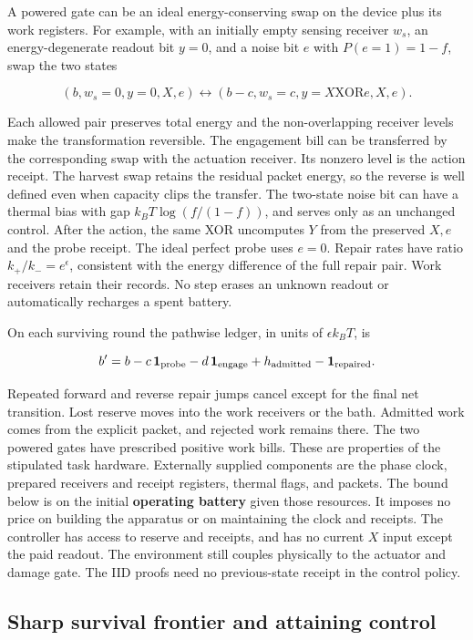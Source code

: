 \documentclass[
  11pt,
]{article}
\begin{document}
A powered gate can be an ideal energy-conserving swap on the device plus
its work registers. For example, with an initially empty sensing
receiver \(w_s\), an energy-degenerate readout bit \(y=0\), and a noise
bit \(e\) with \(P(e=1)=1-f\), swap the two states

\[
(b,w_s=0,y=0,X,e)\leftrightarrow
(b-c,w_s=c,y=X\mathbin{\mathrm{XOR}}e,X,e).
\]

Each allowed pair preserves total energy and the non-overlapping
receiver levels make the transformation reversible. The engagement bill
can be transferred by the corresponding swap with the actuation
receiver. Its nonzero level is the action receipt. The harvest swap
retains the residual packet energy, so the reverse is well defined even
when capacity clips the transfer. The two-state noise bit can have a
thermal bias with gap \(k_BT\log(f/(1-f))\), and serves only as an
unchanged control. After the action, the same XOR uncomputes \(Y\) from
the preserved \(X,e\) and the probe receipt. The ideal perfect probe
uses \(e=0\). Repair rates have ratio \(k_+/k_-=e^\epsilon\), consistent
with the energy difference of the full repair pair. Work receivers
retain their records. No step erases an unknown readout or automatically
recharges a spent battery.

On each surviving round the pathwise ledger, in units of
\(\epsilon k_BT\), is

\[
b'=b-c\,\mathbf1_{\rm probe}-d\,\mathbf1_{\rm engage}
  +h_{\rm admitted}-\mathbf1_{\rm repaired}.
\]

Repeated forward and reverse repair jumps cancel except for the final
net transition. Lost reserve moves into the work receivers or the bath.
Admitted work comes from the explicit packet, and rejected work remains
there. The two powered gates have prescribed positive work bills. These
are properties of the stipulated task hardware. Externally supplied
components are the phase clock, prepared receivers and receipt
registers, thermal flags, and packets. The bound below is on the initial
\textbf{operating battery} given those resources. It imposes no price on
building the apparatus or on maintaining the clock and receipts. The
controller has access to reserve and receipts, and has no current \(X\)
input except the paid readout. The environment still couples physically
to the actuator and damage gate. The IID proofs need no previous-state
receipt in the control policy.

\subsection{Sharp survival frontier and attaining
control}\label{sharp-survival-frontier-and-attaining-control}
\end{document}
